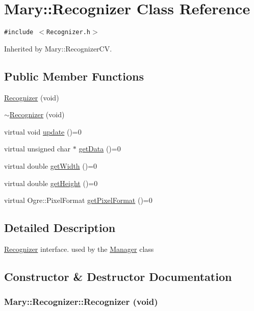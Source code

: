 \hypertarget{class_mary_1_1_recognizer}{
\section{Mary::Recognizer Class Reference}
\label{class_mary_1_1_recognizer}
}
{\tt \#include $<$Recognizer.h$>$}

Inherited by Mary::RecognizerCV.

\subsection*{Public Member Functions}
\begin{CompactItemize}
\item 
\hyperlink{class_mary_1_1_recognizer_f6f1b4ec959172a2bd01dae7b3d4013b}{Recognizer} (void)
\item 
\hyperlink{class_mary_1_1_recognizer_062ba77cf858f8f93c5f8f72361c3c36}{$\sim$Recognizer} (void)
\item 
virtual void \hyperlink{class_mary_1_1_recognizer_8a5f92a1dbb5806bc28447ffef1b9062}{update} ()=0
\item 
virtual unsigned char $\ast$ \hyperlink{class_mary_1_1_recognizer_4dd5b353b3c95eb4d3c9862ffc6833ff}{getData} ()=0
\item 
virtual double \hyperlink{class_mary_1_1_recognizer_3f84cbc919ffbf311d347a51b0ae559b}{getWidth} ()=0
\item 
virtual double \hyperlink{class_mary_1_1_recognizer_3862b6b1cbef243f201c82a9757210cf}{getHeight} ()=0
\item 
virtual Ogre::PixelFormat \hyperlink{class_mary_1_1_recognizer_a8807eec0bac6da199f4b69a8f506a40}{getPixelFormat} ()=0
\end{CompactItemize}


\subsection{Detailed Description}
\hyperlink{class_mary_1_1_recognizer}{Recognizer} interface. used by the \hyperlink{class_mary_1_1_manager}{Manager} class 

\subsection{Constructor \& Destructor Documentation}
\hypertarget{class_mary_1_1_recognizer_f6f1b4ec959172a2bd01dae7b3d4013b}{
\subsubsection[Recognizer]{\setlength{\rightskip}{0pt plus 5cm}Mary::Recognizer::Recognizer (void)}}
\label{class_mary_1_1_recognizer_f6f1b4ec959172a2bd01dae7b3d4013b}


